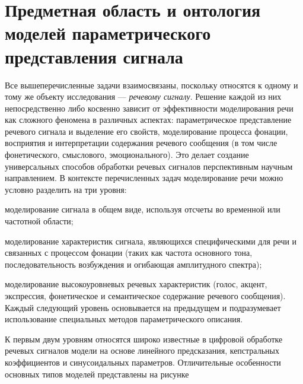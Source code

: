 \section{Предметная область и онтология моделей параметрического представления сигнала}
\label{sec_audio_interfaces_subject_area_signal_models}

Все вышеперечисленные задачи взаимосвязаны, поскольку относятся к одному и тому же объекту исследования --- \textit{речевому сигналу}. Решение каждой из них непосредственно либо косвенно зависит от эффективности моделирования речи как сложного феномена в различных аспектах: параметрическое представление речевого сигнала и выделение его свойств, моделирование процесса фонации, восприятия и интерпретации содержания речевого сообщения (в том числе фонетического, смыслового, эмоционального). Это делает создание универсальных способов обработки речевых сигналов перспективным научным направлением.
В контексте перечисленных задач моделирование речи можно условно разделить на три уровня: 

\begin{textitemize}
    \item моделирование сигнала в общем виде, используя отсчеты во временной или частотной области; 
    \item моделирование характеристик сигнала, являющихся специфическими для речи и связанных с процессом фонации (таких как частота основного тона, последовательность возбуждения и огибающая амплитудного спектра); 
    \item моделирование высокоуровневых речевых характеристик (голос, акцент, экспрессия, фонетическое и семантическое содержание речевого сообщения).  Каждый следующий уровень основывается на предыдущем и подразумевает использование специальных методов параметрического описания.
\end{textitemize}

К первым двум уровням относятся широко известные в цифровой обработке речевых сигналов модели на основе линейного предсказания, кепстральных коэффициентов и синусоидальных параметров. Отличительные особенности основных типов моделей представлены на рисунке \textit{} 


